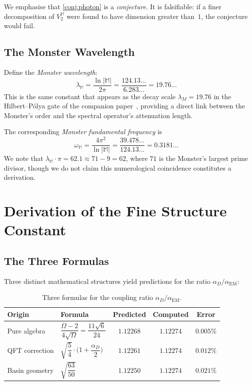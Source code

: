 \documentclass[11pt,a4paper]{article}
\theoremstyle{plain}
\theoremstyle{remark}
\renewcommand{\Omega}{\varOmega}
\newcommand{\abs}[1]{\lvert #1 \rvert}
\newcommand{\aD}{\alpha_D}
\newcommand{\aEM}{\alpha_{\mathrm{EM}}}
\begin{document}
We emphasise that \cref{conj:photon} is a \emph{conjecture}.  It is
falsifiable: if a finer decomposition of $V_2^{\mathbb{M}}$ were found
to have dimension greater than~$1$, the conjecture would fail.

\subsection{The Monster Wavelength}
\label{sec:cascade-wavelength}

Define the \emph{Monster wavelength}:
\[
  \lambda_{\mathbb{M}} = \frac{\ln\abs{\mathbb{M}}}{2\pi}
  = \frac{124.13\ldots}{6.283\ldots}
  = 19.76\ldots
\]
This is the same constant that appears as the decay scale
$\lambda_M=19.76$ in the Hilbert--P\'olya gate of the companion
paper~\cite{DHR2026a}, providing a direct link between the Monster's
order and the spectral operator's attenuation length.

The corresponding \emph{Monster fundamental frequency} is
\[
  \omega_{\mathbb{M}} = \frac{4\pi^2}{\ln\abs{\mathbb{M}}}
  = \frac{39.478\ldots}{124.13\ldots}
  = 0.3181\ldots
\]
We note that $\lambda_{\mathbb{M}}\cdot\pi = 62.1\approx 71-9=62$,
where $71$ is the Monster's largest prime divisor, though we do not
claim this numerological coincidence constitutes a derivation.


\section{Derivation of the Fine Structure Constant}
\label{sec:finestructure}

\subsection{The Three Formulas}
\label{sec:fine-formulas}

Three distinct mathematical structures yield predictions for the ratio
$\aD/\aEM$:

\begin{table}[H]
\centering
\caption{Three formulas for the coupling ratio $\aD/\aEM$.}
\label{tab:formulas}
\smallskip
\begin{tabular}{llccc}
\toprule
\textbf{Origin} & \textbf{Formula} & \textbf{Predicted} & \textbf{Computed}
  & \textbf{Error} \\
\midrule
Pure algebra &
  $\dfrac{\Omega-2}{4\sqrt{\Omega}} = \dfrac{11\sqrt{6}}{24}$ &
  $1.12268$ & $1.12274$ & $0.005\%$ \\[12pt]
QFT correction &
  $\sqrt{\dfrac{5}{4}}\!\cdot\!\bigl(1+\dfrac{\aD}{2}\bigr)$ &
  $1.12261$ & $1.12274$ & $0.012\%$ \\[12pt]
Basin geometry &
  $\sqrt{\dfrac{63}{50}}$ &
  $1.12250$ & $1.12274$ & $0.021\%$ \\
\bottomrule
\end{tabular}
\end{table}
\end{document}
